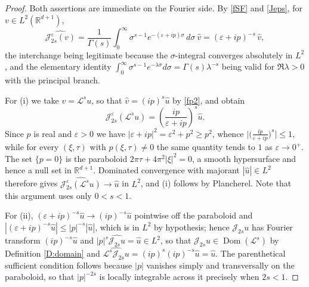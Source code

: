 \documentclass[11pt,letter]{amsart}
\def \R {\mathbb{R}}
\def \G{\Gamma}
\newcommand{\la}{\lambda}
\numberwithin{equation}{section}
\newcommand{\ve}{\varepsilon}
\newcommand{\Le}{\mathcal L}
\newcommand{\Dom}{\operatorname{Dom}}
\numberwithin{equation}{section}
\begin{document}
\begin{proof}
Both assertions are immediate on the Fourier side. By \eqref{fSF} and
\eqref{Jeps}, for $v\in L^2(\R^{d+1})$,
\[
\widehat{\mathscr J^\ve_{2s}(v)}
= \frac{1}{\G(s)}\int_0^\infty \sigma^{s-1}e^{-(\ve+ip)\sigma}\,d\sigma\ \hat v
= (\ve + i p)^{-s}\,\hat v ,
\]
the interchange being legitimate because the $\sigma$-integral converges
absolutely in $L^2$, and the elementary identity
$\int_0^\infty\sigma^{s-1}e^{-\la\sigma}d\sigma=\G(s)\la^{-s}$ being valid for
$\Re\la>0$ with the principal branch.

For (i) we take $v=\Le^su$, so that $\hat v=(ip)^s\hat u$ by \eqref{fp2}, and
obtain
\[
\widehat{\mathscr J^\ve_{2s}(\Le^su)}
= \left(\frac{ip}{\ve+ip}\right)^{s}\hat u .
\]
Since $p$ is real and $\ve>0$ we have $|\ve+ip|^2=\ve^2+p^2\ge p^2$, whence
$\bigl|\bigl(\tfrac{ip}{\ve+ip}\bigr)^{s}\bigr|\le1$, while for every
$(\xi,\tau)$ with $p(\xi,\tau)\ne0$ the same quantity tends to $1$ as
$\ve\to0^+$. The set $\{p=0\}$ is the paraboloid
$2\pi\tau+4\pi^2|\xi|^2=0$, a smooth hypersurface and hence a null set in
$\R^{d+1}$. Dominated convergence with majorant $|\hat u|\in L^2$ therefore
gives $\widehat{\mathscr J^\ve_{2s}(\Le^su)}\to\hat u$ in $L^2$, and (i)
follows by Plancherel. Note that this argument uses only $0<s<1$.

For (ii), $(\ve+ip)^{-s}\hat u\to (ip)^{-s}\hat u$ pointwise off the paraboloid
and $|(\ve+ip)^{-s}\hat u|\le |p|^{-s}|\hat u|$, which is in $L^2$ by
hypothesis; hence $\mathscr J_{2s}u$ has Fourier transform $(ip)^{-s}\hat u$
and $|p|^s\widehat{\mathscr J_{2s}u}=\hat u\in L^2$, so that
$\mathscr J_{2s}u\in\Dom(\Le^s)$ by Definition \ref{D:domain} and
$\widehat{\Le^s\mathscr J_{2s}u}=(ip)^s(ip)^{-s}\hat u=\hat u$. The
parenthetical sufficient condition follows because $|p|$ vanishes simply and
transversally on the paraboloid, so that $|p|^{-2s}$ is locally integrable
across it precisely when $2s<1$.
\end{proof}
\end{document}
